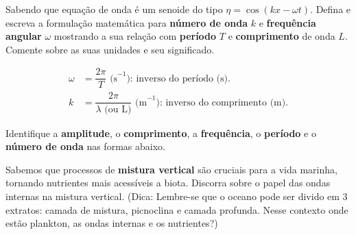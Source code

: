 \documentclass[letterpaper,portuguese,12pt,pdftex]{exam}
\begin{document}
\begin{questions}
\question[2]
  Sabendo que equação de onda é um senoide do tipo $\eta = \cos(kx -\omega t)$.
  Defina e escreva a formulação matemática para {\bf número de onda} $k$ e
  {\bf frequência angular} $\omega$ mostrando a sua relação com {\bf período}
  $T$ e {\bf comprimento} de onda $L$.  Comente sobre as suas unidades e seu
  significado.

  \begin{solution}
    \begin{align*}
      \omega &= \dfrac{2\pi}{T} \text{ (s}^{-1}) \text{: inverso do período (s).}\\
      k &= \dfrac{2\pi}{\lambda {\text{ (ou L)}}} \text{ (m}^{-1}) \text{: inverso do comprimento (m).}
    \end{align*}
  \end{solution}

\question
Identifique a {\bf amplitude}, o {\bf comprimento}, a {\bf frequência}, o
{\bf período} e o {\bf número de onda} nas formas abaixo.


\question[2]
Sabemos que processos de {\bf mistura vertical} são cruciais para a vida
marinha, tornando nutrientes mais acessíveis a biota.  Discorra sobre o papel
das ondas internas na mistura vertical.  (Dica: Lembre-se que o oceano pode ser
divido em 3 extratos: camada de mistura, picnoclina e camada profunda.  Nesse
contexto onde estão plankton, as ondas internas e os nutrientes?)


\end{questions}
\end{document}
